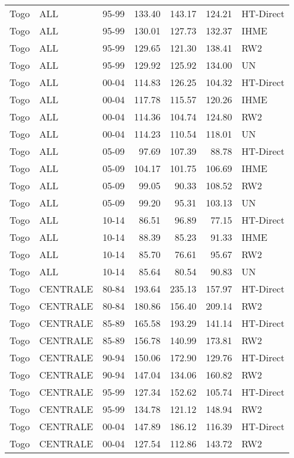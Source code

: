 \begin{longtable}{lllrrrl}
  Togo & ALL & 95-99 & 133.40 & 143.17 & 124.21 & HT-Direct \\ 
  Togo & ALL & 95-99 & 130.01 & 127.73 & 132.37 & IHME \\ 
  Togo & ALL & 95-99 & 129.65 & 121.30 & 138.41 & RW2 \\ 
  Togo & ALL & 95-99 & 129.92 & 125.92 & 134.00 & UN \\ 
  Togo & ALL & 00-04 & 114.83 & 126.25 & 104.32 & HT-Direct \\ 
  Togo & ALL & 00-04 & 117.78 & 115.57 & 120.26 & IHME \\ 
  Togo & ALL & 00-04 & 114.36 & 104.74 & 124.80 & RW2 \\ 
  Togo & ALL & 00-04 & 114.23 & 110.54 & 118.01 & UN \\ 
  Togo & ALL & 05-09 & 97.69 & 107.39 & 88.78 & HT-Direct \\ 
  Togo & ALL & 05-09 & 104.17 & 101.75 & 106.69 & IHME \\ 
  Togo & ALL & 05-09 & 99.05 & 90.33 & 108.52 & RW2 \\ 
  Togo & ALL & 05-09 & 99.20 & 95.31 & 103.13 & UN \\ 
  Togo & ALL & 10-14 & 86.51 & 96.89 & 77.15 & HT-Direct \\ 
  Togo & ALL & 10-14 & 88.39 & 85.23 & 91.33 & IHME \\ 
  Togo & ALL & 10-14 & 85.70 & 76.61 & 95.67 & RW2 \\ 
  Togo & ALL & 10-14 & 85.64 & 80.54 & 90.83 & UN \\ 
  Togo & CENTRALE & 80-84 & 193.64 & 235.13 & 157.97 & HT-Direct \\ 
  Togo & CENTRALE & 80-84 & 180.86 & 156.40 & 209.14 & RW2 \\ 
  Togo & CENTRALE & 85-89 & 165.58 & 193.29 & 141.14 & HT-Direct \\ 
  Togo & CENTRALE & 85-89 & 156.78 & 140.99 & 173.81 & RW2 \\ 
  Togo & CENTRALE & 90-94 & 150.06 & 172.90 & 129.76 & HT-Direct \\ 
  Togo & CENTRALE & 90-94 & 147.04 & 134.06 & 160.82 & RW2 \\ 
  Togo & CENTRALE & 95-99 & 127.34 & 152.62 & 105.74 & HT-Direct \\ 
  Togo & CENTRALE & 95-99 & 134.78 & 121.12 & 148.94 & RW2 \\ 
  Togo & CENTRALE & 00-04 & 147.89 & 186.12 & 116.39 & HT-Direct \\ 
  Togo & CENTRALE & 00-04 & 127.54 & 112.86 & 143.72 & RW2 \\ 

\end{longtable}
